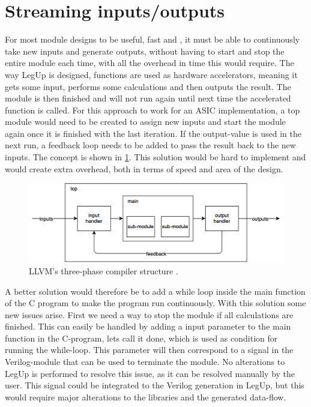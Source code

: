 \section{Streaming inputs/outputs}
For most module designs to be useful, fast and , it must be able to continuously take new inputs and generate outputs, without having to start and stop the entire module each time, with all the overhead in time this would require. The way LegUp is designed, functions are used as hardware accelerators, meaning it gets some input, performs some calculations and then outputs the result. The module is then finished and will not run again until next time the accelerated function is called. For this approach to work for an ASIC implementation, a top module would need to be created to assign new inputs and start the module again once it is finished with the last iteration. If the output-value is used in the next run, a feedback loop needs to be added to pass the result back to the new inputs. The concept is shown in \cref{fig:steamininputstop}. This solution would be hard to implement and would create extra overhead, both in terms of speed and area of the design. 

\begin{figure}[hbpt]
\centering
\includegraphics[width=\textwidth]{../figs/StreamingInputs.png}
\caption{\label{fig:steamininputstop}LLVM's three-phase compiler structure \cite{llvmarch}.}
\end{figure}

A better solution would therefore be to add a while loop inside the main function of the C program to make the program run continuously. With this solution some new issues arise. First we need a way to stop the module if all calculations are finished. This can easily be handled by adding a input parameter to the main function in the C-program, lets call it done, which is used as condition for running the while-loop. This parameter will then correspond to a signal in the Verilog-module that can be used to terminate the module. No alterations to LegUp is performed to resolve this issue, as it can be resolved manually by the user. This signal could be integrated to the Verilog generation in LegUp, but this would require major alterations to the libraries and the generated data-flow.

